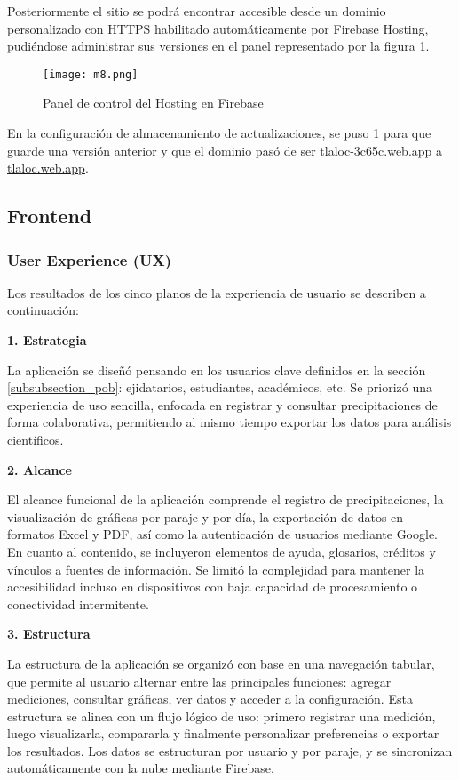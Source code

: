 Posteriormente el sitio se podrá encontrar accesible desde un dominio personalizado con HTTPS habilitado automáticamente por Firebase Hosting, pudiéndose administrar sus versiones en el panel representado por la figura \ref{m8}.
\begin{figure}[ht]
\centering
  \texttt{[image: m8.png]}
  \caption{Panel de control del Hosting en Firebase}
  \label{m8}
\end{figure}
En la configuración de almacenamiento de actualizaciones, se puso 1 para que guarde una versión anterior y que el dominio pasó de ser tlaloc-3c65c.web.app a \url{tlaloc.web.app}.

\newpage
\subsection{Frontend}



 
\subsubsection{User Experience (UX)}
Los resultados de los cinco planos de la experiencia de usuario se describen a continuación:


\textbf{1. Estrategia}

La aplicación se diseñó pensando en los usuarios clave definidos en la sección \ref{subsubsection_pob}: ejidatarios, estudiantes, académicos, etc. Se priorizó una experiencia de uso sencilla, enfocada en registrar y consultar precipitaciones de forma colaborativa, permitiendo al mismo tiempo exportar los datos para análisis científicos.

\textbf{2. Alcance}

El alcance funcional de la aplicación comprende el registro de precipitaciones, la visualización de gráficas por paraje y por día, la exportación de datos en formatos Excel y PDF, así como la autenticación de usuarios mediante Google. En cuanto al contenido, se incluyeron elementos de ayuda, glosarios, créditos y vínculos a fuentes de información. Se limitó la complejidad para mantener la accesibilidad incluso en dispositivos con baja capacidad de procesamiento o conectividad intermitente.

\textbf{3. Estructura}

La estructura de la aplicación se organizó con base en una navegación tabular, que permite al usuario alternar entre las principales funciones: agregar mediciones, consultar gráficas, ver datos y acceder a la configuración. Esta estructura se alinea con un flujo lógico de uso: primero registrar una medición, luego visualizarla, compararla y finalmente personalizar preferencias o exportar los resultados. Los datos se estructuran por usuario y por paraje, y se sincronizan automáticamente con la nube mediante Firebase.

